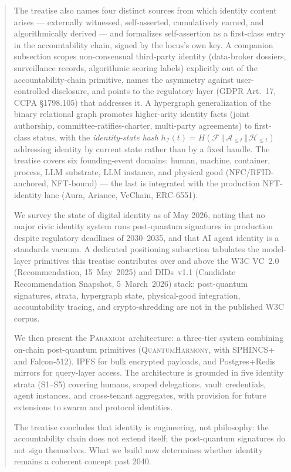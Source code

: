 \documentclass[11pt,a4paper,parskip=half-,DIV=12,headings=standardclasses]{scrartcl}
\theoremstyle{ncthm}
\theoremstyle{ncdef}
\newcommand{\identity}{\mathcal{I}}
\newcommand{\founding}{\mathcal{F}}
\newcommand{\accretion}{\mathcal{A}}
\newcommand{\paraxiom}{\textsc{Paraxiom}}
\newcommand{\qh}{\textsc{QuantumHarmony}}
\begin{document}
\begin{abstract}
The treatise also names four distinct sources from which identity
content arises --- externally witnessed, self-asserted, cumulatively
earned, and algorithmically derived --- and formalizes self-assertion
as a first-class entry in the accountability chain, signed by the
locus's own key. A companion subsection scopes non-consensual
third-party identity (data-broker dossiers, surveillance records,
algorithmic scoring labels) explicitly out of the accountability-chain
primitive, names the asymmetry against user-controlled disclosure, and
points to the regulatory layer (GDPR Art.~17, CCPA \S{}1798.105) that
addresses it. A hypergraph generalization of the binary relational
graph promotes higher-arity identity facts (joint authorship,
committee-ratifies-charter, multi-party agreements) to first-class
status, with the \emph{identity-state hash}
$h_{\identity}(t) = H(\founding \,\Vert\, \accretion_{\le t} \,\Vert\, \mathcal{H}_{\le t})$
addressing identity by current state rather than by a fixed handle.
The treatise covers six founding-event domains: human, machine,
container, process, LLM substrate, LLM instance, and physical good
(NFC/RFID-anchored, NFT-bound) --- the last is integrated with the
production NFT-identity lane (Aura, Arianee, VeChain, ERC-6551).

We survey the state of digital identity as of May 2026, noting that no
major civic identity system runs post-quantum signatures in production
despite regulatory deadlines of 2030--2035, and that AI agent identity
is a standards vacuum. A dedicated positioning subsection tabulates
the model-layer primitives this treatise contributes over and above
the W3C VC~2.0 (Recommendation, 15~May~2025) and DIDs~v1.1 (Candidate
Recommendation Snapshot, 5~March~2026) stack: post-quantum signatures,
strata, hypergraph state, physical-good integration, accountability
tracing, and crypto-shredding are not in the published W3C corpus.

We then present the \paraxiom\ architecture: a three-tier system
combining on-chain post-quantum primitives (\qh, with SPHINCS+ and
Falcon-512), IPFS for bulk encrypted payloads, and Postgres+Redis
mirrors for query-layer access. The architecture is grounded in five
identity strata (S1--S5) covering humans, scoped delegations, vault
credentials, agent instances, and cross-tenant aggregates, with
provision for future extensions to swarm and protocol identities.

The treatise concludes that identity is engineering, not philosophy:
the accountability chain does not extend itself; the post-quantum
signatures do not sign themselves. What we build now determines
whether identity remains a coherent concept past 2040.
\end{abstract}
\end{document}
